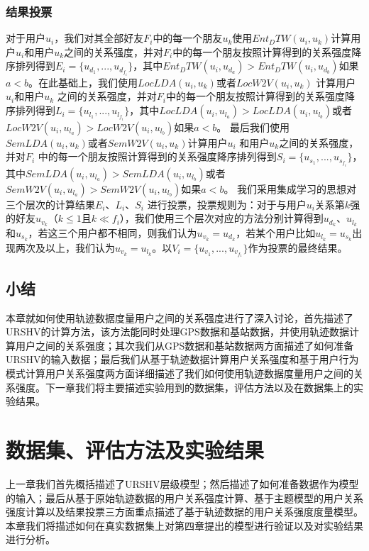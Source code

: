 \subsection{结果投票}
对于用户$u_{i}$，我们对其全部好友$F_{i}$中的每一个朋友$u_{k}$使用$Ent_DTW(u_{i},u_{k})$计算用户$u_{i}$和用户$u_{k}$之间的关系强度，并对$F_{i}$中的每一个朋友按照计算得到的关系强度降序排列得到$E_{i}=\{u_{d_{1}},...,u_{d_{f_{i}}}\}$，其中$Ent_DTW(u_{i},u_{d_{a}})>Ent_DTW(u_{i},u_{d_{b}})$如果$a<b$。在此基础上，我们使用$LocLDA(u_{i},u_{k})$或者$LocW2V(u_{i},u_{k})$ 计算用户$u_{i}$和用户$u_{k}$ 之间的关系强度，并对$F_{i}$中的每一个朋友按照计算得到的关系强度降序排列得到$L_{i}=\{u_{l_{1}},...,u_{l_{f_{i}}}\}$，其中$LocLDA(u_{i},u_{l_{a}})>LocLDA(u_{i},u_{l_{b}})$或者$LocW2V(u_{i},u_{l_{a}})>LocW2V(u_{i},u_{l_{b}})$如果$a<b$。 最后我们使用$SemLDA(u_{i},u_{k})$或者$SemW2V(u_{i},u_{k})$计算用户$u_{i}$ 和用户$u_{k}$之间的关系强度，并对$F_{i}$ 中的每一个朋友按照计算得到的关系强度降序排列得到$S_{i}=\{u_{s_{1}},...,u_{s_{f_{i}}}\}$，其中$SemLDA(u_{i},u_{l_{a}})>SemLDA(u_{i},u_{l_{b}})$或者$SemW2V(u_{i},u_{l_{a}})>SemW2V(u_{i},u_{l_{b}})$如果$a<b$。 我们采用集成学习的思想对三个层次的计算结果$E_{i}$、$L_{i}$、$S_{i}$ 进行投票，投票规则为：对于与用户$u_{i}$关系第$k$强的好友$u_{v_{k}}$（$k\leq 1$且$k\ll f_{i}$），我们使用三个层次对应的方法分别计算得到$u_{d_{k}}$、$u_{l_{k}}$ 和$u_{s_{k}}$，若这三个用户都不相同，则我们认为$u_{v_{k}}=u_{d_{k}}$，若某个用户比如$u_{l_{k}}=u_{s_{k}}$出现两次及以上，我们认为$u_{v_{k}}=u_{l_{k}}$。以$V_{i}=\{u_{v_{1}},...,u_{v_{f_{1}}}\}$作为投票的最终结果。
\section{小结}
\label{sec:section4-4}
本章就如何使用轨迹数据度量用户之间的关系强度进行了深入讨论，首先描述了URSHV的计算方法，该方法能同时处理GPS数据和基站数据，并使用轨迹数据计算用户之间的关系强度；其次我们从GPS数据和基站数据两方面描述了如何准备URSHV的输入数据；最后我们从基于轨迹数据计算用户关系强度和基于用户行为模式计算用户关系强度两方面详细描述了我们如何使用轨迹数据度量用户之间的关系强度。下一章我们将主要描述实验用到的数据集，评估方法以及在数据集上的实验结果。
\chapter{数据集、评估方法及实验结果}
\label{chap:chapter03}
上一章我们首先概括描述了URSHV层级模型；然后描述了如何准备数据作为模型的输入；最后从基于原始轨迹数据的用户关系强度计算、基于主题模型的用户关系强度计算以及结果投票三方面重点描述了基于轨迹数据的用户关系强度度量模型。本章我们将描述如何在真实数据集上对第四章提出的模型进行验证以及对实验结果进行分析。
